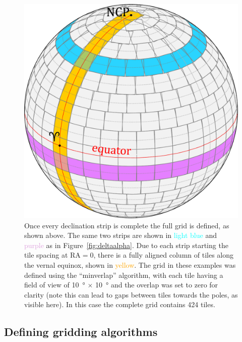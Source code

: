 \begin{colsection}
\begin{colsection}
\begin{figure}[p]
\begin{center}
\includegraphics[width=\linewidth]{images/globe4.pdf}
\end{center}
\caption[A fully tiled sphere]{Once every declination strip is complete the full grid is defined, as shown above. The same two strips are shown in \textcolor{cyan}{light blue} and \textcolor{Plum}{purple} as in Figure~\ref{fig:deltaalpha}. Due to each strip starting the tile spacing at RA$=0$, there is a fully aligned column of tiles along the vernal equinox, shown in \textcolor{orange}{yellow}. The grid in these examples was defined using the ``minverlap'' algorithm, with each tile having a field of view of \SI{10}{\degree} $\times$ \SI{10}{\degree} and the overlap was set to zero for clarity (note this can lead to gaps between tiles towards the poles, as visible here). In this case the complete grid contains 424 tiles.
}
\label{fig:tiledsphere}
\end{figure}

\newpage

\end{colsection}


\subsection{Defining gridding algorithms}
\label{sec:algorithms}
\begin{colsection}


\end{colsection}
\end{colsection}
